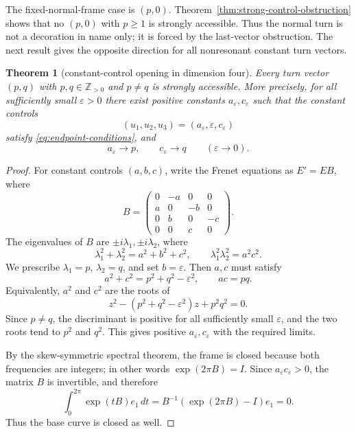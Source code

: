 \documentclass[10pt,a4paper]{amsart}
\newtheorem{theorem}{Theorem}[section]
\newcommand{\eps}{\varepsilon}
\begin{document}
The fixed-normal-frame case is $(p,0)$.  Theorem~\ref{thm:strong-control-obstruction}
shows that no $(p,0)$ with $p\ge1$ is strongly accessible.  Thus the normal turn is
not a decoration in name only; it is forced by the last-vector obstruction.  The next
result gives the opposite direction for all nonresonant constant turn vectors.

\begin{theorem}[constant-control opening in dimension four]\label{thm:constant-control-opening}
Every turn vector $(p,q)$ with $p,q\in\mathbb Z_{>0}$ and $p\ne q$ is strongly
accessible.  More precisely, for all sufficiently small $\eps>0$ there exist positive
constants $a_\eps,c_\eps$ such that the constant controls
\[
        (u_1,u_2,u_3)=(a_\eps,\eps,c_\eps)
\]
satisfy \eqref{eq:endpoint-conditions}, and
\[
        a_\eps\to p,
        \qquad
        c_\eps\to q
        \qquad(\eps\to0).
\]
\end{theorem}

\begin{proof}
For constant controls $(a,b,c)$, write the Frenet equations as $E'=EB$, where
\[
        B=\begin{pmatrix}
        0&-a&0&0\\
        a&0&-b&0\\
        0&b&0&-c\\
        0&0&c&0
        \end{pmatrix}.
\]
The eigenvalues of $B$ are $\pm i\lambda_1,\pm i\lambda_2$, where
\begin{equation}\label{eq:frequency-relations}
        \lambda_1^2+\lambda_2^2=a^2+b^2+c^2,
        \qquad
        \lambda_1^2\lambda_2^2=a^2c^2 .
\end{equation}
We prescribe $\lambda_1=p$, $\lambda_2=q$, and set $b=\eps$.  Then $a,c$ must
satisfy
\[
        a^2+c^2=p^2+q^2-\eps^2,
        \qquad
        ac=pq .
\]
Equivalently, $a^2$ and $c^2$ are the roots of
\[
        z^2-(p^2+q^2-\eps^2)z+p^2q^2=0 .
\]
Since $p\ne q$, the discriminant is positive for all sufficiently small $\eps$, and
the two roots tend to $p^2$ and $q^2$.  This gives positive $a_\eps,c_\eps$ with the
required limits.

By the skew-symmetric spectral theorem, the frame is closed because both frequencies
are integers; in other words $\exp(2\pi B)=I$.  Since $a_\eps c_\eps>0$, the matrix
$B$ is invertible, and therefore
\[
        \int_0^{2\pi}\exp(tB)e_1\,dt
        =B^{-1}(\exp(2\pi B)-I)e_1=0.
\]
Thus the base curve is closed as well.
\end{proof}
\end{document}
